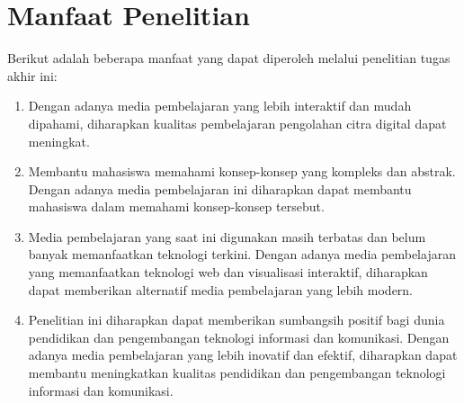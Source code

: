 \section{Manfaat Penelitian}
Berikut adalah beberapa manfaat yang dapat diperoleh melalui penelitian tugas akhir ini:
\begin{enumerate}
	\item Dengan adanya media pembelajaran yang lebih interaktif dan mudah dipahami, diharapkan kualitas pembelajaran pengolahan citra digital dapat meningkat.
	\item Membantu mahasiswa memahami konsep-konsep yang kompleks dan abstrak. Dengan adanya media pembelajaran ini diharapkan dapat membantu mahasiswa dalam memahami konsep-konsep tersebut.
	\item Media pembelajaran yang saat ini digunakan masih terbatas dan belum banyak memanfaatkan teknologi terkini. Dengan adanya media pembelajaran yang memanfaatkan teknologi web dan visualisasi interaktif, diharapkan dapat memberikan alternatif media pembelajaran yang lebih modern.
	\item Penelitian ini diharapkan dapat memberikan sumbangsih positif bagi dunia pendidikan dan pengembangan teknologi informasi dan komunikasi. Dengan adanya media pembelajaran yang lebih inovatif dan efektif, diharapkan dapat membantu meningkatkan kualitas pendidikan dan pengembangan teknologi informasi dan komunikasi.
\end{enumerate}
